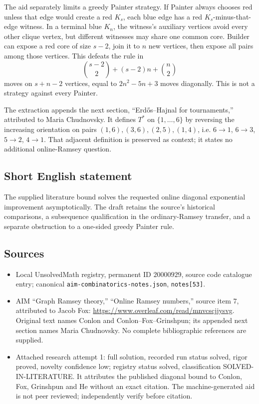 \documentclass[11pt]{article}
\begin{document}
The aid separately limits a greedy Painter strategy. If Painter always chooses red unless that edge would create a red $K_s$, each blue edge has a red $K_s$-minus-that-edge witness. In a terminal blue $K_n$, the witness's auxiliary vertices avoid every other clique vertex, but different witnesses may share one common core. Builder can expose a red core of size $s-2$, join it to $n$ new vertices, then expose all pairs among those vertices. This defeats the rule in
\[
\binom{s-2}2+(s-2)n+\binom n2
\]
moves on $s+n-2$ vertices, equal to $2n^2-5n+3$ moves diagonally. This is not a strategy against every Painter.

The extraction appends the next section, ``Erd\H{o}s--Hajnal for tournaments,'' attributed to Maria Chudnovsky. It defines $T^*$ on $\{1,\ldots,6\}$ by reversing the increasing orientation on pairs $(1,6),(3,6),(2,5),(1,4)$, i.e. $6\to1$, $6\to3$, $5\to2$, $4\to1$. That adjacent definition is preserved as context; it states no additional online-Ramsey question.
\subsection{Short English statement}
The supplied literature bound solves the requested online diagonal exponential improvement asymptotically. The draft retains the source's historical comparisons, a subsequence qualification in the ordinary-Ramsey transfer, and a separate obstruction to a one-sided greedy Painter rule.
\subsection{Sources}
\begin{itemize}
\item Local UnsolvedMath registry, permanent ID $20000929$, source code catalogue entry; canonical \texttt{aim-combinatorics-notes.json}, \texttt{notes[53]}.
\item AIM ``Graph Ramsey theory,'' ``Online Ramsey numbers,'' source item 7, attributed to Jacob Fox: \url{https://www.overleaf.com/read/mnvcscjjysvg}. Original text names Conlon and Conlon--Fox--Grinshpun; its appended next section names Maria Chudnovsky. No complete bibliographic references are supplied.
\item Attached research attempt 1: full solution, recorded run status solved, rigor proved, novelty confidence low; registry status solved, classification SOLVED-IN-LITERATURE. It attributes the published diagonal bound to Conlon, Fox, Grinshpun and He without an exact citation. The machine-generated aid is not peer reviewed; independently verify before citation.
\end{itemize}
\end{document}
